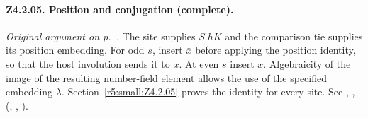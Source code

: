 \paragraph{Z4.2.05. Position and conjugation (complete).}\label{r6:review:Z4.2.05} \emph{Original argument on p.~\pageref{r5:small:Z4.2.05}.} 
The site supplies $S.hK$ and the comparison tie supplies its position embedding. For odd $s$, insert $\bar x$ before applying the position identity, so that the host involution sends it to $x$. At even $s$ insert $x$. Algebraicity of the image of the resulting number-field element allows the use of the specified embedding $\lambda$. Section~\ref{r5:small:Z4.2.05} proves the identity for every site. See , ,  (, , ).

